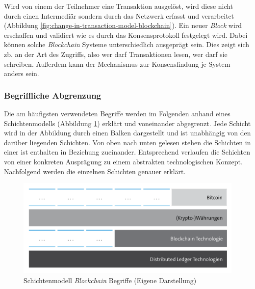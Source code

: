 \noindent
Wird von einem der Teilnehmer eine Transaktion ausgelöst, wird diese nicht durch einen Intermediär sondern durch das Netzwerk erfasst und verarbeitet (Abbildung \ref{fig:change-in-transaction-model-blockchain}). Ein neuer \textit{Block} wird erschaffen und validiert wie es durch das Konsensprotokoll festgelegt wird. Dabei können solche \textit{Blockchain} Systeme unterschiedlich ausgeprägt sein. Dies zeigt sich zb. an der Art des Zugriffs, also wer darf Transaktionen lesen, wer darf sie schreiben. Außerdem kann der Mechanismus zur Konsensfindung je System anders sein.





\subsubsection{Begriffliche Abgrenzung}

Die am häufigsten verwendeten Begriffe werden im Folgenden anhand eines Schichtenmodells (Abbildung \ref{fig:layer-model-blockchain}) erklärt und voneinander abgegrenzt. Jede Schicht wird in der Abbildung durch einen Balken dargestellt und ist unabhängig von den darüber liegenden Schichten. Von oben nach unten gelesen stehen die Schichten in einer \glqq ist enthalten in\grqq{} Beziehung zueinander. Entsprechend verlaufen die Schichten von einer konkreten Ausprägung zu einem abstrakten technologischen Konzept. Nachfolgend werden die einzelnen Schichten genauer erklärt.

\begin{figure}[H]
	\centering
	\includegraphics[width=1.0\linewidth]{pictures/layer-model-blockchain}
	\caption[Schichtenmodell \textit{Blockchain} Begriffe]{Schichtenmodell \textit{Blockchain} Begriffe (Eigene Darstellung)}
	\label{fig:layer-model-blockchain}
\end{figure}

